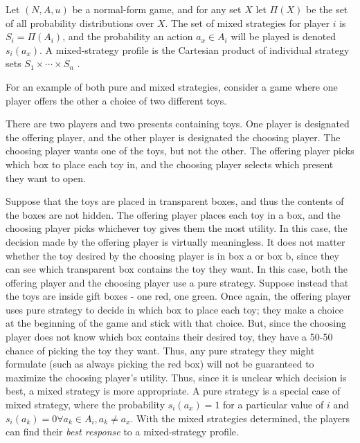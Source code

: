 \begin{define}
  Let $(N,A,u)$ be a normal-form game, and for any set $X$ let $\Pi(X)$ be the set of all probability distributions over $X$. The set of mixed strategies for player $i$ is $S_i = \Pi(A_i)$, and the probability an action $a_x\in A_i$ will be played is denoted $s_i(a_x)$. A mixed-strategy profile is the Cartesian product of individual strategy sets $S_1\times\cdots\times S_n$ \cite{shoh09}.
\end{define}

For an example of both pure and mixed strategies, consider a game where one player offers the other a choice of two different toys.

\begin{exmp}
  There are two players and two presents containing toys. One player is designated the offering player, and the other player is designated the choosing player. The choosing player wants one of the toys, but not the other. The offering player picks which box to place each toy in, and the choosing player selects which present they want to open.
\end{exmp}

Suppose that the toys are placed in transparent boxes, and thus the contents of the boxes are not hidden. The offering player places each toy in a box, and the choosing player picks whichever toy gives them the most utility. In this case, the decision made by the offering player is virtually meaningless. It does not matter whether the toy desired by the choosing player is in box a or box b, since they can see which transparent box contains the toy they want. In this case, both the offering player and the choosing player use a pure strategy. Suppose instead that the toys are inside gift boxes - one red, one green. Once again, the offering player uses pure strategy to decide in which box to place each toy; they make a choice at the beginning of the game and stick with that choice. But, since the choosing player does not know which box contains their desired toy, they have a 50-50 chance of picking the toy they want. Thus, any pure strategy they might formulate (such as always picking the red box) will not be guaranteed to maximize the choosing player's utility. Thus, since it is unclear which decision is best, a mixed strategy is more appropriate. A pure strategy is a special case of mixed strategy, where the probability $s_i(a_x)=1$ for a particular value of $i$ and $s_i(a_k)=0 \forall a_k\in A_i, a_k \neq a_x$. With the mixed strategies determined, the players can find their \textit{best response} to a mixed-strategy profile.

